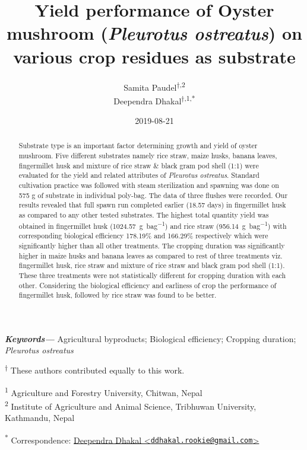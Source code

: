 \documentclass[]{article}
\title{Yield performance of Oyster mushroom (\textit{Pleurotus ostreatus}) on various crop residues as substrate}
\author{Samita Paudel\textsuperscript{$\dagger{}$,2} \\ Deependra Dhakal\textsuperscript{$\dagger{}$,1,*}}
\date{2019-08-21}
\begin{document}
\maketitle
\begin{abstract}
Substrate type is an important factor determining growth and yield of oyster mushroom. Five different substrates namely rice straw, maize husks, banana leaves, fingermillet husk and mixture of rice straw \& black gram pod shell (1:1) were evaluated for the yield and related attributes of \textit{Pleurotus ostreatus}. Standard cultivation practice was followed with steam sterilization and spawning was done on 575 g of substrate in individual poly-bag. The data of three flushes were recorded. Our results revealed that full spawn run completed earlier (18.57 days) in fingermillet husk as compared to any other tested substrates. The highest total quantity yield was obtained in fingermillet husk (\SI{1024.57}{\gram \per bag}) and rice straw (\SI{956.14}{\gram \per bag}) with corresponding biological efficiency 178.19\% and 166.29\% respectively which were significantly higher than all other treatments. The cropping duration was significantly higher in maize husks and banana leaves as compared to rest of three treatments viz. fingermillet husk, rice straw and mixture of rice straw and black gram pod shell (1:1). These three treatments were not statistically different for cropping duration with each other. Considering the biological efficiency and earliness of crop the performance of fingermillet husk, followed by rice straw was found to be better.
\end{abstract}
\providecommand{\keywords}[1]{\textbf{\textit{Keywords---}} #1}
    \keywords{Agricultural byproducts; Biological efficiency; Cropping duration; \textit{Pleurotus ostreatus}}

{
\setcounter{tocdepth}{3}
\tableofcontents
}
\textsuperscript{$\dagger{}$} These authors contributed equally to this work.

\textsuperscript{1} Agriculture and Forestry University, Chitwan, Nepal\\
\textsuperscript{2} Institute of Agriculture and Animal Science, Tribhuwan University, Kathmandu, Nepal

\textsuperscript{*} Correspondence: \href{mailto:ddhakal.rookie@gmail.com}{Deependra Dhakal \textless{}\href{mailto:ddhakal.rookie@gmail.com}{\nolinkurl{ddhakal.rookie@gmail.com}}\textgreater{}}

\linenumbers

\clearpage
\end{document}
